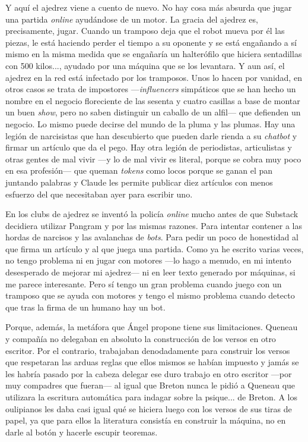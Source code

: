\documentclass[11pt,a4paper]{article}
\begin{document}
Y aquí el ajedrez viene a cuento de nuevo. No hay cosa más absurda que jugar una partida \emph{online} ayudándose de un motor. La gracia del ajedrez es, precisamente, jugar. Cuando un tramposo deja que el robot mueva por él las piezas, le está haciendo perder el tiempo a su oponente y se está engañando a sí mismo en la misma medida que se engañaría un halterófilo que hiciera sentadillas con 500 kilos..., ayudado por una máquina que se los levantara. Y aun así, el ajedrez en la red está infectado por los tramposos. Unos lo hacen por vanidad, en otros casos se trata de impostores ---\emph{influencers} simpáticos que se han hecho un nombre en el negocio floreciente de las sesenta y cuatro casillas a base de montar un buen \emph{show}, pero no saben distinguir un caballo de un alfil--- que defienden un negocio. Lo mismo puede decirse del mundo de la pluma y las plumas. Hay una legión de narcisistas que han descubierto que pueden darle rienda a su \emph{chatbot} y firmar un artículo que da el pego. Hay otra legión de periodistas, articulistas y otras gentes de mal vivir ---y lo de mal vivir es literal, porque se cobra muy poco en esa profesión--- que queman \emph{tokens} como locos porque se ganan el pan juntando palabras y Claude les permite publicar diez artículos con menos esfuerzo del que necesitaban ayer para escribir uno. 

En los clubs de ajedrez se inventó la policía \emph{online} mucho antes de que Substack decidiera utilizar Pangram y por las mismas razones. Para intentar contener a las hordas de narcisos y las avalanchas de \emph{bots}. Para pedir un poco de honestidad al que firma un artículo y al que juega una partida. Como ya he escrito varias veces, no tengo problema ni en jugar con motores ---lo hago a menudo, en mi intento desesperado de mejorar mi ajedrez--- ni en leer texto generado por máquinas, si me parece interesante. Pero sí tengo un gran problema cuando juego con un tramposo que se ayuda con motores y tengo el mismo problema cuando detecto que tras la firma de un humano hay un bot. 

Porque, además, la metáfora que Ángel propone tiene sus limitaciones. Queneau y compañía no delegaban en absoluto la construcción de los versos en otro escritor. Por el contrario, trabajaban denodadamente para construir los versos que respetaran las arduas reglas que ellos mismos se habían impuesto y jamás se les habría pasado por la cabeza delegar ese duro trabajo en otro escritor ---por muy compadres que fueran--- al igual que Breton nunca le pidió a Queneau que utilizara la escritura automática para indagar sobre la psique... de Breton. A los oulipianos les daba casi igual qué se hiciera luego con los versos de sus tiras de papel, ya que para ellos la literatura consistía en construir la máquina, no en darle al botón y hacerle escupir teoremas. 
\end{document}
